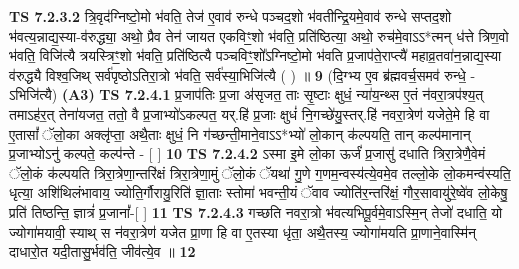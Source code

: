 \documentclass[17pt]{extarticle}
\begin{document}
                  \newline
                                \textbf{ TS 7.2.3.2} \newline
                  त्रि॒वृद॑ग्निष्टो॒मो भ॑वति॒ तेज॑ ए॒वाव॑ रुन्धे पञ्चद॒शो भ॑वतीन्द्रि॒यमे॒वाव॑ रुन्धे सप्तद॒शो भ॑वत्य॒न्नाद्य॒स्या-व॑रुद्ध्या॒ अथो॒ प्रैव तेन॑ जायत एकविꣳ॒॒शो भ॑वति॒ प्रति॑ष्ठित्या॒ अथो॒ रुच॑मे॒वाऽऽ*त्मन् ध॑त्ते त्रिण॒वो भ॑वति॒ विजि॑त्यै त्रयस्त्रिꣳ॒॒शो भ॑वति॒ प्रति॑ष्ठित्यै पञ्चविꣳ॒॒शो᳚ऽग्निष्टो॒मो भ॑वति प्र॒जाप॑ते॒राप्त्यै॑ महाव्र॒तवा॑न॒न्नाद्य॒स्या व॑रुद्ध्यै विश्व॒जिथ् सर्व॑पृष्ठोऽतिरा॒त्रो भ॑वति॒ सर्व॑स्या॒भिजि॑त्यै ( ) ॥ \textbf{  9} \newline
                  \newline
                      (दि॒ग्भ्य ए॒व ब्र॑ह्मवर्च॒समव॑ रुन्धे॒ - ऽभिजि॑त्यै)  \textbf{(A3)} \newline \newline
                                        \textbf{ TS 7.2.4.1} \newline
                  प्र॒जाप॑तिः प्र॒जा अ॑सृजत॒ ताः सृ॒ष्टाः क्षुधं॒ न्या॑य॒न्थ्स ए॒तं न॑वरा॒त्रप॑श्य॒त् तमाऽह॑र॒त् तेना॑यजत॒ ततो॒ वै प्र॒जाभ्यो॑ऽकल्पत॒ यर्.हि॑ प्र॒जाः क्षुधं॑ नि॒गच्छे॑यु॒स्तर्.हि॑ नवरा॒त्रेण॑ यजेते॒मे हि वा ए॒तासां᳚ ॅलो॒का अक्लृ॑प्ता॒ अथै॒ताः क्षुधं॒ नि ग॑च्छन्ती॒माने॒वाऽऽ*भ्यो॑ लो॒कान् क॑ल्पयति॒ तान् कल्प॑मानान् प्र॒जाभ्योऽनु॑ कल्पते॒ कल्प॑न्ते - [  ] \textbf{  10} \newline
                  \newline
                                \textbf{ TS 7.2.4.2} \newline
                  ऽस्मा इ॒मे लो॒का ऊर्जं॑ प्र॒जासु॑ दधाति त्रिरा॒त्रेणै॒वेमं ॅलो॒कं क॑ल्पयति त्रिरा॒त्रेणा॒न्तरि॑क्षं त्रिरा॒त्रेणा॒मुं ॅलो॒कं ॅयथा॑ गु॒णे ग॒णम॒न्वस्य॑त्ये॒वमे॒व तल्लो॒के लो॒कमन्व॑स्यति॒ धृत्या॒ अशि॑थिलंभावाय॒ ज्योति॒र्गौरायु॒रिति॑ ज्ञा॒ताः स्तोमा॑ भवन्ती॒यं ॅवाव ज्योति॑र॒न्तरि॑क्षं॒ गौर॒सावायु॑रे॒ष्वे॑व लो॒केषु॒ प्रति॑ तिष्ठन्ति॒ ज्ञात्रं॑ प्र॒जानां᳚-[  ] \textbf{  11} \newline
                  \newline
                                \textbf{ TS 7.2.4.3} \newline
                  गच्छति नवरा॒त्रो भ॑वत्यभिपू॒र्वमे॒वाऽस्मि॒न् तेजो॑ दधाति॒ यो ज्योगा॑मयावी॒ स्याथ् स न॑वरा॒त्रेण॑ यजेत प्रा॒णा हि वा ए॒तस्या धृ॑ता॒ अथै॒तस्य॒ ज्योगा॑मयति प्रा॒णाने॒वास्मि॑न् दाधारो॒त यदी॒तासु॒र्भव॑ति॒ जीव॑त्ये॒व ॥ \textbf{  12} \newline
                  \newline
\end{document}
